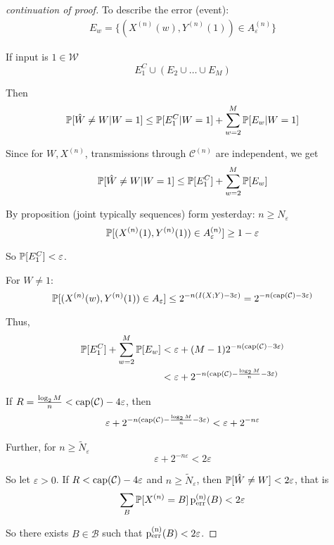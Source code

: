 \documentclass[mfit.tex]{subfiles}
\begin{document}
\begin{proof}[continuation of proof]
To describe the error (event):
\begin{align*}
  E_w = \{ (X^{(n)}(w),Y^{(n)}(1)) \in A_\varepsilon^{(n)} \}
\end{align*}

If input is $1 \in \mathcal{W}$
\[ E_1^C \cup (E_2 \cup \dots \cup E_M) \]

Then
\begin{align*}
  \operatorname{\mathbb{P}}[\hat{W} \neq W| W=1] \leq \operatorname{\mathbb{P}}[E_1^C|W=1] + \sum_{w=2}^M \operatorname{\mathbb{P}}[E_w| W=1]
\end{align*}

Since for $W,X^{(n)}$, transmissions through $\mathcal{C}^{(n)}$ are independent, we get
\begin{align*}
  \operatorname{\mathbb{P}}[\hat{W} \neq W| W=1] \leq \operatorname{\mathbb{P}}[E_1^C] + \sum_{w=2}^M \operatorname{\mathbb{P}}[E_w]
\end{align*}

By proposition (joint typically sequences) form yesterday: $n \geq N_\varepsilon$
\[ \operatorname{\mathbb{P}}[(X^{(n)}(1),Y^{(n)}(1)) \in A_\varepsilon^{(n)}] \geq 1 - \varepsilon \]

So $\operatorname{\mathbb{P}}[E_1^C] < \varepsilon$.

For $W \neq 1$: 
\[ \operatorname{\mathbb{P}}[(X^{(n)}(w),Y^{(n)}(1)) \in A_\varepsilon] \leq 2^{-n(I(X;Y) - 3 \varepsilon)} = 2^{-n(\operatorname{cap}(\mathcal{C}) - 3 \varepsilon)} \]

Thus,
\begin{align*}
  \operatorname{\mathbb{P}}[E_1^C] + \sum_{w=2}^M \operatorname{\mathbb{P}}[E_w] &< \varepsilon + (M-1) 2^{-n(\operatorname{cap}(\mathcal{C}) - 3 \varepsilon)} \\
  &< \varepsilon + 2^{-n (\operatorname{cap}(\mathcal{C}) - \frac{\log_2 M}{n} - 3 \varepsilon)}
\end{align*}

If $R = \frac{\log_2 M}{n} < \operatorname{cap}(\mathcal{C}) - 4 \varepsilon$, then
\begin{align*}
  \varepsilon + 2^{-n (\operatorname{cap}(\mathcal{C}) - \frac{\log_2 M}{n} - 3 \varepsilon)} < \varepsilon + 2^{-n \varepsilon}
\end{align*}

Further, for $n \geq \tilde{N}_\varepsilon$
\[ \varepsilon + 2^{-n \varepsilon} < 2 \varepsilon \]

So let $\varepsilon > 0$.
If $R < \operatorname{cap}(\mathcal{C}) - 4 \varepsilon$ and $n \geq \tilde{N}_\varepsilon$, then $\operatorname{\mathbb{P}}[\hat{W} \neq W] < 2 \varepsilon$, that is
\[ \sum_B \operatorname{\mathbb{P}}[X^{(n)} = B] \operatorname{p_{\text{err}}^{(n)}}(B) < 2 \varepsilon \]

So there exists $B \in \mathcal{B}$ such that $\operatorname{p_{\text{err}}^{(n)}}(B) < 2 \varepsilon$.


\end{proof}
\end{document}
